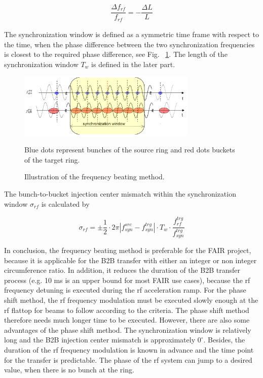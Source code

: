 \begin{equation}
\frac{\Delta f_{\mathit{rf}}}{f_{\mathit{rf}}}= -   \frac{\Delta{L}}{L}
\label{eq:eq4}
\end{equation}

The synchronization window is defined as a symmetric time frame with respect to the time, when the phase difference between the two synchronization frequencies is closest to the required phase difference, see Fig. ~\ref{frequency_beat}. The length of the synchronization window $T_w$ is defined in the later part.
\begin{figure}[!htb]
   \centering   
   \includegraphics*[width=85mm]{frequency_beating.png}
   \caption{Illustration of the frequency beating method.}{\small{Blue dots represent bunches of the source ring and red dots buckets of the target ring.}}
   \label{frequency_beat}
\end{figure}

The bunch-to-bucket injection center mismatch within the synchronization window $\sigma_\mathit{rf}$ is calculated by %

\begin{equation}
\sigma_\mathit{rf}=\pm \frac{1}{2}\cdot 2\pi|f_{\mathit{syn}}^\mathit{src}-f_{\mathit{syn}}^\mathit{trg}|\cdot T_\mathit{w} \cdot \frac{f_{\mathit{rf}}^\mathit{trg}}{f_{\mathit{syn}}^\mathit{trg}}\label{phase_mismatch_win}
\end{equation}

In conclusion, the frequency beating method is preferable for the FAIR project, because it is applicable for the B2B transfer with either an integer or non integer circumference ratio. In addition, it reduces the duration of the B2B transfer process (e.g. 10 ms is an upper bound for most FAIR use cases), because the rf frequency detuning is executed during the rf acceleration ramp. For the phase shift method, the rf frequency modulation must be executed slowly enough at the rf flattop for beams to follow according to the criteria. The phase shift method therefore needs much longer time to be executed. However, there are also some advantages of the phase shift method. The synchronization window is relatively long and the B2B injection center mismatch is approximately $0^\circ$. Besides, the duration of the rf frequency modulation is known in advance and the time point for the transfer is predictable. The phase of the rf system can jump to a desired value, when there is no bunch at the ring.  
